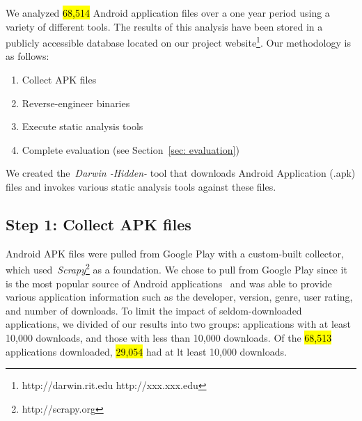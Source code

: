 We analyzed \hl{68,514} Android application files over a one year period using a variety of different tools. The results of this analysis have been stored in a publicly accessible database located on our project website\footnote{\ifisnopii http://darwin.rit.edu \else http://xxx.xxx.edu \fi}. Our methodology is as follows:

\begin{enumerate}
    \setlength{\itemsep}{0pt} %
    \setlength{\parskip}{0pt} %
    \setlength{\parsep}{0pt}  %

  \item Collect APK files
  \item Reverse-engineer binaries
  \item Execute static analysis tools
  \item Complete evaluation (see Section~\ref{sec: evaluation})
\end{enumerate}

We created the~\emph{\ifisnopii Darwin \else -Hidden- \fi} tool that downloads Android Application (.apk) files and invokes various static analysis tools against these files.

\label{sec: collection}
\subsection{Step 1: Collect APK files}

Android APK files were pulled from Google Play with a custom-built collector, which used~\emph{Scrapy}\footnote{http://scrapy.org} as a foundation. We chose to pull from Google Play since it is the most popular source of Android applications~\cite{listofstores_URL} and was able to provide various application information such as the developer, version, genre, user rating, and number of downloads. To limit the impact of seldom-downloaded applications, we divided of our results into two groups: applications with at least 10,000 downloads, and those with less than 10,000 downloads. Of the \hl{68,513} applications downloaded, \hl{29,054} had at lt least 10,000 downloads.


